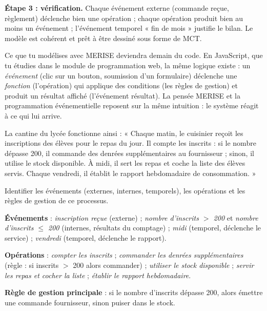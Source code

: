 \documentclass[11pt]{article}
\begin{document}
\begin{exoresolu}
\textbf{Étape 3 : vérification.} Chaque événement externe (commande reçue, règlement) déclenche bien une opération ; chaque opération produit bien au moins un événement ; l'événement temporel « fin de mois » justifie le bilan. Le modèle est cohérent et prêt à être dessiné sous forme de MCT.
\end{exoresolu}

\begin{savaistu}
Ce que tu modélises avec MERISE deviendra demain du code. En JavaScript, que tu étudies dans le module de programmation web, la même logique existe : un \emph{événement} (clic sur un bouton, soumission d'un formulaire) déclenche une \emph{fonction} (l'opération) qui applique des conditions (les règles de gestion) et produit un résultat affiché (l'événement résultat). La pensée MERISE et la programmation événementielle reposent sur la même intuition : le système réagit à ce qui lui arrive.
\end{savaistu}

\begin{exercice}
La cantine du lycée fonctionne ainsi : « Chaque matin, le cuisinier reçoit les inscriptions des élèves pour le repas du jour. Il compte les inscrits : si le nombre dépasse 200, il commande des denrées supplémentaires au fournisseur ; sinon, il utilise le stock disponible. À midi, il sert les repas et coche la liste des élèves servis. Chaque vendredi, il établit le rapport hebdomadaire de consommation. »

Identifier les événements (externes, internes, temporels), les opérations et les règles de gestion de ce processus.
\end{exercice}

\begin{corrige}
\textbf{Événements} : \emph{inscription reçue} (externe) ; \emph{nombre d'inscrits $>$ 200} et \emph{nombre d'inscrits $\leq$ 200} (internes, résultats du comptage) ; \emph{midi} (temporel, déclenche le service) ; \emph{vendredi} (temporel, déclenche le rapport).

\textbf{Opérations} : \emph{compter les inscrits} ; \emph{commander les denrées supplémentaires} (règle : si inscrits $>$ 200 alors commander) ; \emph{utiliser le stock disponible} ; \emph{servir les repas et cocher la liste} ; \emph{établir le rapport hebdomadaire}.

\textbf{Règle de gestion principale} : si le nombre d'inscrits dépasse 200, alors émettre une commande fournisseur, sinon puiser dans le stock.
\end{corrige}
\end{document}
